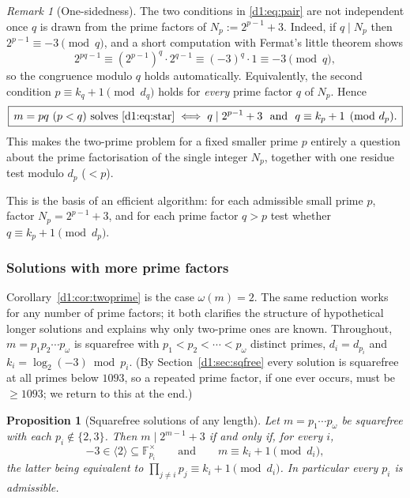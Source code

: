\documentclass[a4paper]{article}
\theoremstyle{plain}
\newtheorem{proposition}{Proposition}[subsection]
\theoremstyle{definition}
\theoremstyle{remark}
\newtheorem{remark}{Remark}[subsection]
\newcommand{\F}{\mathbb{F}}
\newcommand{\gen}[1]{\langle #1 \rangle}
\begin{document}
\begin{remark}[One-sidedness]\label{d1:rem:onesided}
The two conditions in \eqref{d1:eq:pair} are not independent once $q$ is drawn from the prime
factors of $N_{p}:=2^{p-1}+3$. Indeed, if $q\mid N_{p}$ then $2^{p-1}\equiv-3\pmod q$, and a
short computation with Fermat's little theorem shows
\[
2^{pq-1}\equiv (2^{p-1})^{q}\cdot 2^{q-1}\equiv(-3)^{q}\cdot 1\equiv -3\pmod q,
\]
so the congruence modulo $q$ holds automatically. Equivalently, the second condition
$p\equiv k_{q}+1\pmod{d_{q}}$ holds for \emph{every} prime factor $q$ of $N_{p}$. Hence
\[
\boxed{\,m=pq\ (p<q)\text{ solves }\eqref{d1:eq:star}\iff q\mid 2^{p-1}+3\ \text{ and }\ q\equiv k_{p}+1\pmod{d_{p}}.\,}
\]
This makes the two-prime problem for a fixed smaller prime $p$ entirely a question about the
prime factorisation of the single integer $N_{p}$, together with one residue test modulo
$d_{p}$ ($<p$).
\end{remark}

This is the basis of an efficient algorithm: for each admissible small prime $p$, factor
$N_{p}=2^{p-1}+3$, and for each prime factor $q>p$ test whether $q\equiv k_{p}+1\pmod{d_{p}}$.

\subsubsection{Solutions with more prime factors}\label{d1:sec:omega}

Corollary~\ref{d1:cor:twoprime} is the case $\omega(m)=2$. The same reduction works for any number
of prime factors; it both clarifies the structure of hypothetical longer solutions and explains
why only two-prime ones are known. Throughout, $m=p_{1}p_{2}\cdots p_{\omega}$ is squarefree with
$p_{1}<p_{2}<\cdots<p_{\omega}$ distinct primes, $d_{i}=d_{p_{i}}$ and $k_{i}=\log_{2}(-3)\bmod
p_{i}$. (By Section~\ref{d1:sec:sqfree} every solution is squarefree at all primes below $1093$, so
a repeated prime factor, if one ever occurs, must be $\ge 1093$; we return to this at the end.)

\begin{proposition}[Squarefree solutions of any length]\label{d1:prop:omega}
Let $m=p_{1}\cdots p_{\omega}$ be squarefree with each $p_{i}\notin\{2,3\}$. Then
$m\mid 2^{m-1}+3$ if and only if, for every $i$,
\[
-3\in\gen{2}\subseteq\F_{p_{i}}^{\times}\qquad\text{and}\qquad m\equiv k_{i}+1\pmod{d_{i}},
\]
the latter being equivalent to $\displaystyle\prod_{j\ne i}p_{j}\equiv k_{i}+1\pmod{d_{i}}$. In
particular every $p_{i}$ is admissible.
\end{proposition}
\end{document}
